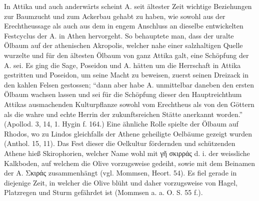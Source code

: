 \documentclass[a4paper, 11pt, oneside]{article}
\begin{document}
In Attika und auch anderwärts scheint A. seit ältester Zeit wichtige Beziehungen zur Baumzucht und zum Ackerbau gehabt zu haben, wie sowohl aus der Erechtheussage als auch aus dem in engem Anschluss an dieselbe entwickelten Festcyclus der A. in Athen hervorgeht. So behauptete man, dass der uralte Ölbaum auf der athenischen Akropolis, welcher nahe einer salzhaltigen Quelle wurzelte und für den ältesten Ölbaum von ganz Attika galt, eine Schöpfung der A. sei. Es ging die Sage, Poseidon und A. hätten um die Herrschaft in Attika gestritten und Poseidon, um seine Macht zu beweisen, zuerst seinen Dreizack in den kahlen Felsen gestossen; "`dann aber habe A. unmittelbar daneben den ersten Ölbaum wachsen lassen und sei für die Schöpfung dieser den Hauptreichthum Attikas ausmachenden Kulturpflanze sowohl vom Erechtheus als von den Göttern als die wahre und echte Herrin der zukunftsreichen Stätte anerkannt worden."' (Apollod. 3, 14, 1. Hygin f. 164.) Eine ähnliche Rolle spielte der Ölbaum auf Rhodos, wo zu Lindos gleichfalls der Athene geheiligte Oelbäume gezeigt wurden (Anthol. 15, 11). Das Fest dieser die Oelkultur fördernden und schützenden Athene hieß Skirophorien, welcher Name wohl mit γῆ σκιρράς d. i. der weissliche Kalkboden, auf welchem die Olive vorzugsweise gedeiht, sowie mit dem Beinamen der A. Σκιράς zusammenhängt (vgl. Mommsen, Heort. 54). Es fiel gerade in diejenige Zeit, in welcher die Olive blüht und daher vorzugsweise von Hagel, Platzregen und Sturm gefährdet ist (Mommsen a. a. O. S. 55 f.).
\end{document}
